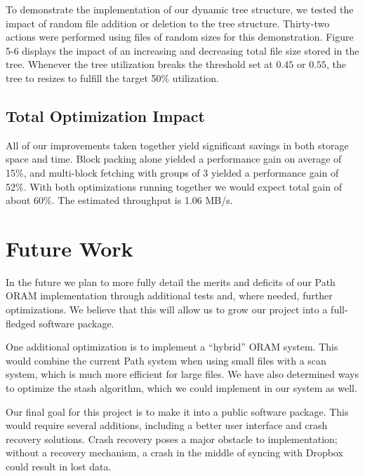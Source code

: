 \documentclass[conference]{IEEEtran}
\begin{document}
To demonstrate the implementation of our dynamic tree structure, we tested the impact of random file addition or deletion to the tree structure. Thirty-two actions were performed using files of random sizes for this demonstration. Figure 5-6 displays the impact of an increasing and decreasing total file size stored in the tree. Whenever the tree utilization breaks the threshold set at $0.45$ or $0.55$, the tree to resizes to fulfill the target 50\% utilization.

\subsection{Total Optimization Impact}

All of our improvements taken together yield significant savings in both storage space and time. Block packing alone yielded a performance gain on average of 15\%, and multi-block fetching with groups of 3 yielded a performance gain of 52\%. With both optimizations running together we would expect total gain of about 60\%. The estimated throughput is 1.06 MB/s. 

\section{Future Work}

In the future we plan to more fully detail the merits and deficits of our Path ORAM implementation through additional tests and, where needed, further optimizations. We believe that this will allow us to grow our project into a full-fledged software package.

One additional optimization is to implement a “hybrid” ORAM system. This would combine the current Path system when using small files with a scan system, which is much more efficient for large files. We have also determined ways to optimize the stash algorithm, which we could implement in our system as well.

Our final goal for this project is to make it into a public software package. This would require several additions, including a better user interface and crash recovery solutions. Crash recovery poses a major obstacle to implementation; without a recovery mechanism, a crash in the middle of syncing with Dropbox could result in lost data.
\end{document}
